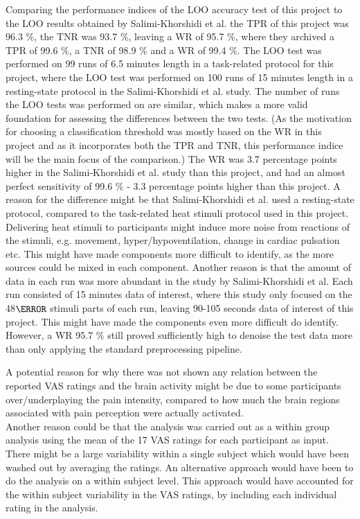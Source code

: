 Comparing the performance indices of the LOO accuracy test of this project to the LOO results obtained by Salimi-Khorshidi et al. \cite{Salimi-Khorshidi2014} the TPR of this project was 96.3 \%, the TNR was 93.7 \%, leaving a  WR of 95.7 \%, where they archived a TPR of 99.6 \%, a TNR of 98.9 \% and a WR of 99.4 \%. The LOO test was performed on 99 runs of 6.5 minutes length in a task-related protocol for this project, where the LOO test was performed on 100 runs of 15 minutes length in a resting-state protocol in the Salimi-Khorshidi et al. study. The number of runs the LOO tests was performed on are similar, which makes a more valid foundation for assessing the differences between the two tests. (As the motivation for choosing a classification threshold was mostly based on the WR in this project and as it incorporates both the TPR and TNR, this performance indice will be the main focus of the comparison.) The WR was 3.7 percentage points higher in the Salimi-Khorshidi et al. study than this project, and had an almost perfect sensitivity of 99.6 \% - 3.3 percentage points higher than this project. A reason for the difference might be that Salimi-Khorshidi et al. used a resting-state protocol, compared to the task-related heat stimuli protocol used in this project. Delivering heat stimuli to participants might induce more noise from reactions of the stimuli, e.g. movement, hyper/hypoventilation, change in cardiac pulsation etc. This might have made components more difficult to identify, as the more sources could be mixed in each component. Another reason is that the amount of data in each run was more abundant in the study by Salimi-Khorshidi et al. Each run consisted of 15 minutes data of interest, where this study only focused on the 48$\degree$ stimuli parts of each run, leaving 90-105 seconds data of interest of this project. This might have made the components even more difficult do identify. However, a WR 95.7 \% still proved sufficiently high to denoise the test data more than only applying the standard preprocessing pipeline. 

A potential reason for why there was not shown any relation between the reported VAS ratings and the brain activity might be due to some participants over/underplaying the pain intensity, compared to how much the brain regions associated with pain perception were actually activated. \\
Another reason could be that the analysis was carried out as a within group analysis using the mean of the 17 VAS ratings for each participant as input. There might be a large variability within a single subject which would have been washed out by averaging the ratings. An alternative approach would have been to do the analysis on a within subject level. This approach would have accounted for the within subject variability in the VAS ratings, by including each individual rating in the analysis. 

